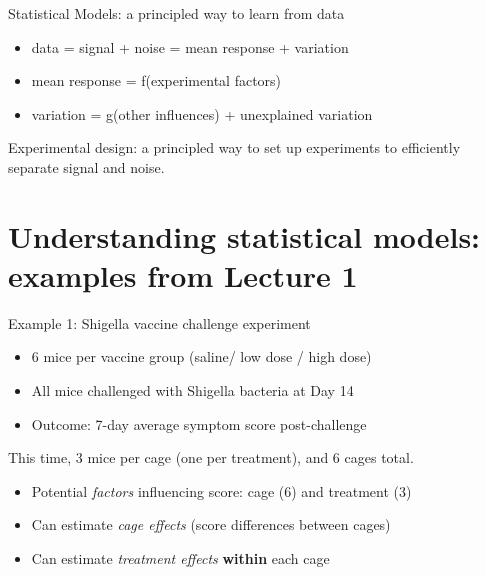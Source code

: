 \documentclass[
  12pt,
  ignorenonframetext,
  aspectratio=169,
]{beamer}
\providecommand{\tightlist}{%
  \setlength{\itemsep}{0pt}\setlength{\parskip}{0pt}}
\begin{document}
\begin{frame}{Statistical Models: a principled way to learn from data}
\protect\hypertarget{statistical-models-a-principled-way-to-learn-from-data}{}

\begin{itemize}
\tightlist
\item
  data = signal + noise = mean response + variation
\item
  mean response = f(experimental factors)
\item
  variation = g(other influences) + unexplained variation
\end{itemize}

\begin{block}{Experimental design: a principled way to set up
experiments to efficiently separate signal and noise.}

\end{block}

\end{frame}

\hypertarget{understanding-statistical-models-examples-from-lecture-1}{%
\section{Understanding statistical models: examples from Lecture
1}\label{understanding-statistical-models-examples-from-lecture-1}}

\begin{frame}{Example 1: Shigella vaccine challenge experiment}
\protect\hypertarget{example-1-shigella-vaccine-challenge-experiment}{}

\begin{itemize}
\tightlist
\item
  6 mice per vaccine group (saline/ low dose / high dose)
\item
  All mice challenged with Shigella bacteria at Day 14
\item
  Outcome: 7-day average symptom score post-challenge
\end{itemize}

This time, 3 mice per cage (one per treatment), and 6 cages total.

\begin{itemize}
\tightlist
\item
  Potential \emph{factors} influencing score: cage (6) and treatment (3)
\item
  Can estimate \emph{cage effects} (score differences between cages)
\item
  Can estimate \emph{treatment effects} \textbf{within} each cage
\end{itemize}

\end{frame}
\end{document}
